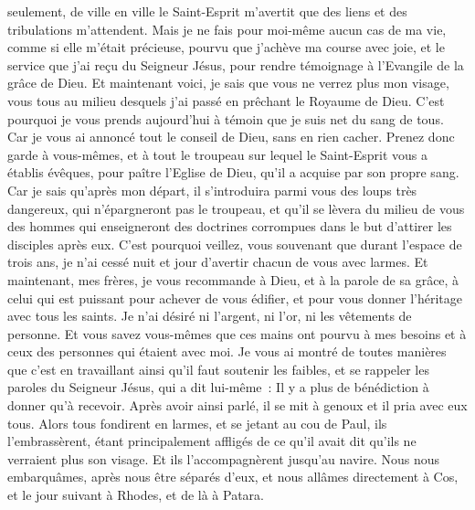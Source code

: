 \begin{multicols}{2}
seulement, de ville en ville le Saint-Esprit m'avertit que des liens et des tribulations m'attendent.
Mais je ne fais pour moi-même aucun cas de ma vie, comme si elle m'était précieuse, pourvu que j'achève ma course avec joie, et le service que j'ai reçu du Seigneur Jésus, pour rendre témoignage à l'Evangile de la grâce de Dieu.
Et maintenant voici, je sais que vous ne verrez plus mon visage, vous tous au milieu desquels j'ai passé en prêchant le Royaume de Dieu.
C'est pourquoi je vous prends aujourd'hui à témoin que je suis net du sang de tous.
Car je vous ai annoncé tout le conseil de Dieu, sans en rien cacher.
Prenez donc garde à vous-mêmes, et à tout le troupeau sur lequel le Saint-Esprit vous a établis évêques, pour paître l'Eglise de Dieu, qu'il a acquise par son propre sang.
Car je sais qu'après mon départ, il s'introduira parmi vous des loups très dangereux, qui n'épargneront pas le troupeau,
et qu'il se lèvera du milieu de vous des hommes qui enseigneront des doctrines corrompues dans le but d'attirer les disciples après eux.
C'est pourquoi veillez, vous souvenant que durant l'espace de trois ans, je n'ai cessé nuit et jour d'avertir chacun de vous avec larmes.
Et maintenant, mes frères, je vous recommande à Dieu, et à la parole de sa grâce, à celui qui est puissant pour achever de vous édifier, et pour vous donner l'héritage avec tous les saints.
Je n'ai désiré ni l'argent, ni l'or, ni les vêtements de personne.
Et vous savez vous-mêmes que ces mains ont pourvu à mes besoins et à ceux des personnes qui étaient avec moi.
Je vous ai montré de toutes manières que c'est en travaillant ainsi qu'il faut soutenir les faibles, et se rappeler les paroles du Seigneur Jésus, qui a dit lui-même~: Il y a plus de bénédiction à donner qu'à recevoir.
Après avoir ainsi parlé, il se mit à genoux et il pria avec eux tous.
Alors tous fondirent en larmes, et se jetant au cou de Paul,
ils l'embrassèrent, étant principalement affligés de ce qu'il avait dit qu'ils ne verraient plus son visage. Et ils l'accompagnèrent jusqu'au navire.
\VerseOne{}Nous nous embarquâmes, après nous être séparés d'eux, et nous allâmes directement à Cos, et le jour suivant à Rhodes, et de là à Patara.

\end{multicols}
